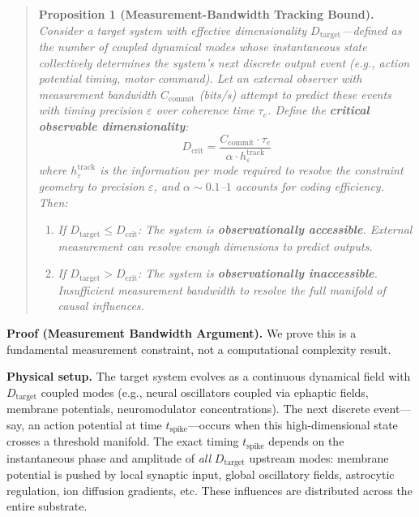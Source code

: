 \documentclass[12pt]{article}
\begin{document}
\begin{quote}
\textbf{Proposition 1 (Measurement-Bandwidth Tracking Bound).} \textit{Consider a target system with effective dimensionality $D_{\text{target}}$---defined as the number of coupled dynamical modes whose instantaneous state collectively determines the system's next discrete output event (e.g., action potential timing, motor command). Let an external observer with measurement bandwidth $C_{\text{commit}}$ (bits/s) attempt to predict these events with timing precision $\varepsilon$ over coherence time $\tau_e$. Define the \textbf{critical observable dimensionality}:}
\begin{equation}
D_{\text{crit}} = \frac{C_{\text{commit}} \cdot \tau_e}{\alpha \cdot h_\varepsilon^{\text{track}}}
\end{equation}
\textit{where $h_\varepsilon^{\text{track}}$ is the information per mode required to resolve the constraint geometry to precision $\varepsilon$, and $\alpha \sim 0.1$--$1$ accounts for coding efficiency. Then:}
\begin{enumerate}
\item \textit{If $D_{\text{target}} \le D_{\text{crit}}$: The system is \textbf{observationally accessible}. External measurement can resolve enough dimensions to predict outputs.}
\item \textit{If $D_{\text{target}} > D_{\text{crit}}$: The system is \textbf{observationally inaccessible}. Insufficient measurement bandwidth to resolve the full manifold of causal influences.}
\end{enumerate}
\end{quote}

\textbf{Proof (Measurement Bandwidth Argument).} We prove this is a fundamental measurement constraint, not a computational complexity result.

\textbf{Physical setup.} The target system evolves as a continuous dynamical field with $D_{\text{target}}$ coupled modes (e.g., neural oscillators coupled via ephaptic fields, membrane potentials, neuromodulator concentrations). The next discrete event---say, an action potential at time $t_{\text{spike}}$---occurs when this high-dimensional state crosses a threshold manifold. The exact timing $t_{\text{spike}}$ depends on the instantaneous phase and amplitude of \textit{all} $D_{\text{target}}$ upstream modes: membrane potential is pushed by local synaptic input, global oscillatory fields, astrocytic regulation, ion diffusion gradients, etc. These influences are distributed across the entire substrate.
\end{document}
